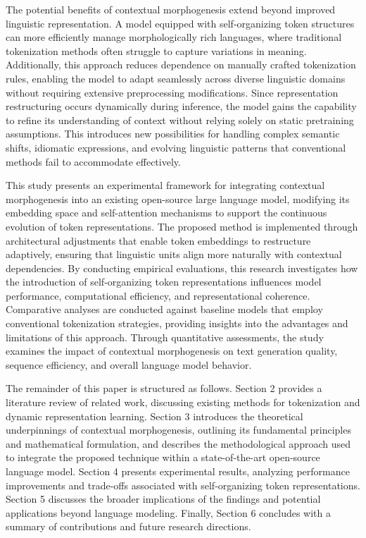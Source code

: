 \documentclass{article}
\begin{document}
The potential benefits of contextual morphogenesis extend beyond improved linguistic representation. A model equipped with self-organizing token structures can more efficiently manage morphologically rich languages, where traditional tokenization methods often struggle to capture variations in meaning. Additionally, this approach reduces dependence on manually crafted tokenization rules, enabling the model to adapt seamlessly across diverse linguistic domains without requiring extensive preprocessing modifications. Since representation restructuring occurs dynamically during inference, the model gains the capability to refine its understanding of context without relying solely on static pretraining assumptions. This introduces new possibilities for handling complex semantic shifts, idiomatic expressions, and evolving linguistic patterns that conventional methods fail to accommodate effectively.

This study presents an experimental framework for integrating contextual morphogenesis into an existing open-source large language model, modifying its embedding space and self-attention mechanisms to support the continuous evolution of token representations. The proposed method is implemented through architectural adjustments that enable token embeddings to restructure adaptively, ensuring that linguistic units align more naturally with contextual dependencies. By conducting empirical evaluations, this research investigates how the introduction of self-organizing token representations influences model performance, computational efficiency, and representational coherence. Comparative analyses are conducted against baseline models that employ conventional tokenization strategies, providing insights into the advantages and limitations of this approach. Through quantitative assessments, the study examines the impact of contextual morphogenesis on text generation quality, sequence efficiency, and overall language model behavior.

The remainder of this paper is structured as follows. Section 2 provides a literature review of related work, discussing existing methods for tokenization and dynamic representation learning. Section 3 introduces the theoretical underpinnings of contextual morphogenesis, outlining its fundamental principles and mathematical formulation, and describes the methodological approach used to integrate the proposed technique within a state-of-the-art open-source language model. Section 4 presents experimental results, analyzing performance improvements and trade-offs associated with self-organizing token representations. Section 5 discusses the broader implications of the findings and potential applications beyond language modeling. Finally, Section 6 concludes with a summary of contributions and future research directions.
\end{document}
